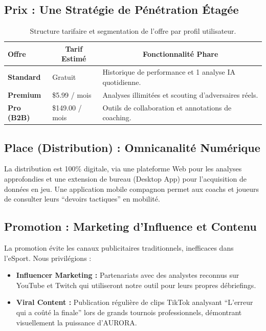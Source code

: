 \documentclass[a4paper,11pt]{article}
\begin{document}
\subsection{Prix : Une Stratégie de Pénétration Étagée}
\begin{table}[h]
\centering
\small
\renewcommand{\arraystretch}{1.5}
\begin{tabularx}{\textwidth}{|l|l|X|}
\hline
\rowcolor{academic-blue!10} \textbf{Offre} & \multicolumn{1}{c|}{\textbf{Tarif Estimé}} & \multicolumn{1}{c|}{\textbf{Fonctionnalité Phare}} \\ \hline
\textbf{Standard} & Gratuit & Historique de performance et 1 analyse IA quotidienne. \\ \hline
\textbf{Premium} & \$5.99 / mois & Analyses illimitées et scouting d'adversaires réels. \\ \hline
\textbf{Pro (B2B)} & \$149.00 / mois & Outils de collaboration et annotations de coaching. \\ \hline
\end{tabularx}
\caption{Structure tarifaire et segmentation de l'offre par profil utilisateur.}
\end{table}

\newpage

\subsection{Place (Distribution) : Omnicanalité Numérique}
La distribution est 100\% digitale, via une plateforme Web pour les analyses approfondies et une extension de bureau (Desktop App) pour l'acquisition de données en jeu. Une application mobile compagnon permet aux coachs et joueurs de consulter leurs \enquote{devoirs tactiques} en mobilité.

\subsection{Promotion : Marketing d'Influence et Contenu}
La promotion évite les canaux publicitaires traditionnels, inefficaces dans l'eSport. Nous privilégions :
\begin{itemize}
    \item \textbf{Influencer Marketing :} Partenariats avec des analystes reconnus sur YouTube et Twitch qui utiliseront notre outil pour leurs propres débriefings.
    \item \textbf{Viral Content :} Publication régulière de clips TikTok analysant \enquote{L'erreur qui a coûté la finale} lors de grands tournois professionnels, démontrant visuellement la puissance d'AURORA.
\end{itemize}
\end{document}
